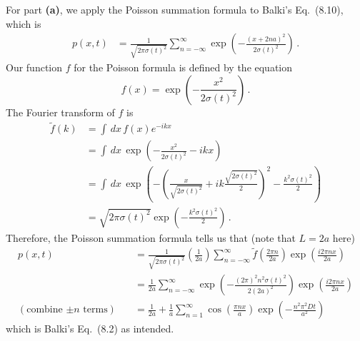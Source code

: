 
For part \textbf{(a)}, we apply the Poisson summation formula to Balki's Eq.~(8.10), which is
\begin{align*}
  p(x, t)
  &= \frac{1}{\sqrt{2 \pi \sigma(t)^2}} \sum_{n=-\infty}^\infty \exp \left(
    - \frac{(x + 2 n a )^2}{2 \sigma(t)^2}
  \right)
  \, .
\end{align*}
Our function $f$ for the Poisson formula is defined by the equation
\begin{equation*}
  f(x) = \exp \left( - \frac{x^2}{2 \sigma(t)^2} \right)
  \, .
\end{equation*}
The Fourier transform of $f$ is
\begin{align*}
  \tilde{f}(k)
  &= \int \, dx \, f(x) e^{-i k x} \\
  &= \int \, dx \, \exp \left( -\frac{x^2}{2 \sigma(t)^2} - i k x \right) \\
  &= \int \, dx \, \exp \left( -
    \left(
      \frac{x}{\sqrt{2 \sigma(t)^2}} + i k \frac{\sqrt{2 \sigma(t)^2}}{2}
    \right)^2
    - \frac{k^2 \sigma(t)^2}{2}
  \right) \\
  &= \sqrt{2 \pi \sigma(t)^2} \exp \left( - \frac{k^2 \sigma(t)^2}{2} \right)
  \, .
\end{align*}
Therefore, the Poisson summation formula tells us that (note that $L = 2a$ here)
\begin{align*}
  p(x, t)
  &= \frac{1}{\sqrt{2 \pi \sigma(t)^2}}
    \left( \frac{1}{2a} \right)
    \sum_{n=-\infty}^\infty
    \tilde{f} \left(\frac{2 \pi n}{2a} \right)
    \exp \left( \frac{i 2 \pi n x}{2 a}\right)
    \\
  &= \frac{1}{2a}
    \sum_{n=-\infty}^\infty
    \exp \left( - \frac{(2 \pi)^2 n^2 \sigma(t)^2}{2 (2 a)^2} \right)
    \exp \left( \frac{i 2 \pi n x}{2 a} \right)
    \\
  (\text{combine $\pm n$ terms}) \quad
  &= \frac{1}{2a} + \frac{1}{a} \sum_{n=1}^\infty
    \cos \left( \frac{\pi n x}{a} \right)
    \exp \left( - \frac{n^2 \pi^2 D t}{a^2} \right)
\end{align*}
which is Balki's Eq.~(8.2) as intended.

